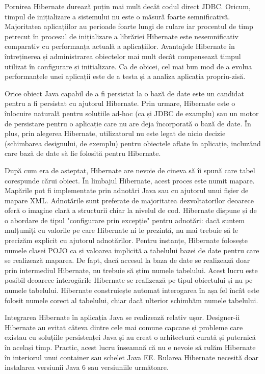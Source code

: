 \documentclass[12pt]{book}
\begin{document}
Pornirea Hibernate durează puțin mai mult decât codul direct JDBC. Oricum, timpul de inițializare a sistemului nu este o măsură foarte semnificativă. Majoritatea aplicațiilor au perioade foarte lungi de rulare iar procentul de timp petrecut în procesul de inițializare a librăriei Hibernate este nesemnificativ comparativ cu performanța actuală a aplicațiilor. Avantajele Hibernate în întreținerea și administrarea obiectelor mai mult decât compensează timpul utilizat în configurare și inițializare. Ca de obicei, cel mai bun mod de a evolua performanțele unei aplicații este de a testa și a analiza aplicația propriu-zisă.

Orice obiect Java capabil de a fi persistat la o bază de date este un candidat pentru a fi persistat cu ajutorul Hibernate. Prin urmare, Hibernate este o înlocuire naturală pentru soluțiile ad-hoc (ca și JDBC de examplu) sau un motor de persistare pentru o aplicație care nu are deja încorporată o bază de date. În plus, prin alegerea Hibernate, utilizatorul nu este legat de nicio decizie (schimbarea designului, de exemplu) pentru obiectele aflate în aplicație, incluzând care bază de date să fie folosită pentru Hibernate.

După cum era de așteptat, Hibernate are nevoie de cineva să îi spună care tabel corespunde cărui obiect. În limbajul Hibernate, acest proces este numit mapare. Mapările pot fi implementate prin adnotări Java sau cu ajutorul unui fișier de mapare XML. Adnotările sunt preferate de majoritatea dezvoltatorilor deoarece oferă o imagine clară a structurii chiar la nivelul de cod. Hibernate dispune și de o abordare de tipul "configurare prin excepție" pentru adnotări: dacă suntem mulțumiți cu valorile pe care Hibernate ni le prezintă, nu mai trebuie să le precizăm explicit cu ajutorul adnotărilor. Pentru instanțe, Hibernate folosește numele clasei POJO ca și valoarea implicită a tabelului bazei de date pentru care se realizează maparea. De fapt, dacă accesul la baza de date se realizează doar prin intermediul Hibernate, nu trebuie să știm numele tabelului. Acest lucru este posibil deoarece interogările Hibernate se realizează pe tipul obiectului și nu pe numele tabelului. Hibernate construiește automat interogarea în așa fel încât este folosit numele corect al tabelului, chiar dacă ulterior schimbăm numele tabelului. \cite{BeginningHibernate}

Integrarea Hibernate în aplicația Java se realizează relativ ușor. Designer-ii Hibernate au evitat câteva dintre cele mai comune capcane și probleme care existau cu soluțiile persistenței Java și au creat o arhitectură curată și puternică în același timp. Practic, acest lucru înseamnă că nu e nevoie să rulăm Hibernate în interiorul unui container sau schelet Java EE. Rularea Hibernate necesită doar instalarea versiunii Java 6 sau versiuniile următoare.
\end{document}
